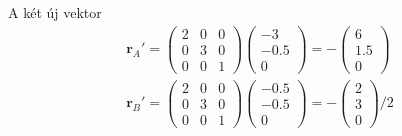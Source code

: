 \documentclass[12pt,a4paper]{scrartcl}
\let\mathbf\bm
\begin{document}
A két új vektor
\[\begin{aligned}
  {{\mathbf{r}}_A}' = \left( {\begin{array}{*{20}{c}}
  2&0&0 \\ 
  0&3&0 \\ 
  0&0&1 
\end{array}} \right)\left( {\begin{array}{*{20}{c}}
  { - 3} \\ 
  { - 0.5} \\ 
  0 
\end{array}} \right) =  - \left( {\begin{array}{*{20}{c}}
  6 \\ 
  {1.5} \\ 
  0 
\end{array}} \right) \\ 
  {{\mathbf{r}}_B}' = \left( {\begin{array}{*{20}{c}}
  2&0&0 \\ 
  0&3&0 \\ 
  0&0&1 
\end{array}} \right)\left( {\begin{array}{*{20}{c}}
  { - 0.5} \\ 
  { - 0.5} \\ 
  0 
\end{array}} \right) =  - \left( {\begin{array}{*{20}{c}}
  2 \\ 
  3 \\ 
  0 
\end{array}} \right)/2 \\ 
\end{aligned} \]
\end{document}

